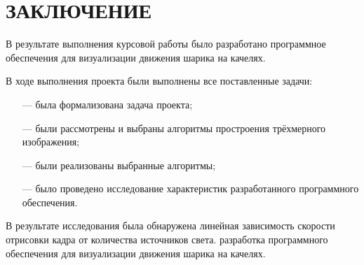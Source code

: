 \chapter*{ЗАКЛЮЧЕНИЕ}

В результате выполнения курсовой работы было разработано программное обеспечения для визуализации движения шарика на качелях.

В ходе выполнения проекта были выполнены все поставленные задачи:
\begin{itemize}
	\item[---] была формализована задача проекта;
	\item[---] были рассмотрены и выбраны алгоритмы простроения трёхмерного изображения;
	\item[---] были реализованы выбранные алгоритмы;
	\item[---] было проведено исследование характеристик разработанного программного обеспечения.
\end{itemize}

В результате исследования была обнаружена линейная зависимость скорости отрисовки кадра от количества источников света. разработка программного обеспечения для визуализации движения шарика на качелях.

\pagebreak